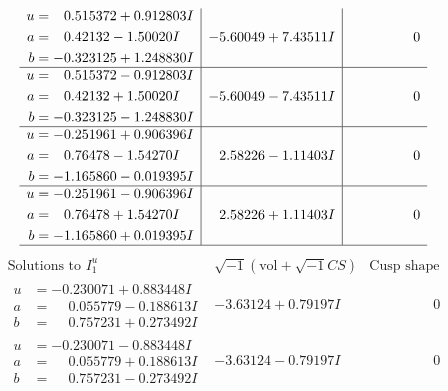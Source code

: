 \documentclass[1p]{elsarticle_modified}
\theoremstyle{definition}
\newcommand{\I}{\sqrt{-1}}
\begin{document}
$$\begin{array}{c|c|c}
\begin{aligned}
u &= \phantom{-}0.515372 + 0.912803 I \\
a &= \phantom{-}0.42132 - 1.50020 I \\
b &= -0.323125 + 1.248830 I\end{aligned}
 & -5.60049 + 7.43511 I & \phantom{-0.000000 } 0 \\ \hline\begin{aligned}
u &= \phantom{-}0.515372 - 0.912803 I \\
a &= \phantom{-}0.42132 + 1.50020 I \\
b &= -0.323125 - 1.248830 I\end{aligned}
 & -5.60049 - 7.43511 I & \phantom{-0.000000 } 0 \\ \hline\begin{aligned}
u &= -0.251961 + 0.906396 I \\
a &= \phantom{-}0.76478 - 1.54270 I \\
b &= -1.165860 - 0.019395 I\end{aligned}
 & \phantom{-}2.58226 - 1.11403 I & \phantom{-0.000000 } 0 \\ \hline\begin{aligned}
u &= -0.251961 - 0.906396 I \\
a &= \phantom{-}0.76478 + 1.54270 I \\
b &= -1.165860 + 0.019395 I\end{aligned}
 & \phantom{-}2.58226 + 1.11403 I & \phantom{-0.000000 } 0\\
 \hline 
 \end{array}$$\newpage$$\begin{array}{c|c|c}  
\text{Solutions to }I^u_{1}& \I (\text{vol} + \sqrt{-1}CS) & \text{Cusp shape}\\
 \hline 
\begin{aligned}
u &= -0.230071 + 0.883448 I \\
a &= \phantom{-}0.055779 - 0.188613 I \\
b &= \phantom{-}0.757231 + 0.273492 I\end{aligned}
 & -3.63124 + 0.79197 I & \phantom{-0.000000 } 0 \\ \hline\begin{aligned}
u &= -0.230071 - 0.883448 I \\
a &= \phantom{-}0.055779 + 0.188613 I \\
b &= \phantom{-}0.757231 - 0.273492 I\end{aligned}
 & -3.63124 - 0.79197 I & \phantom{-0.000000 } 0 \\ \hline\begin{aligned}

\end{aligned}
\end{array}$$
\end{document}
